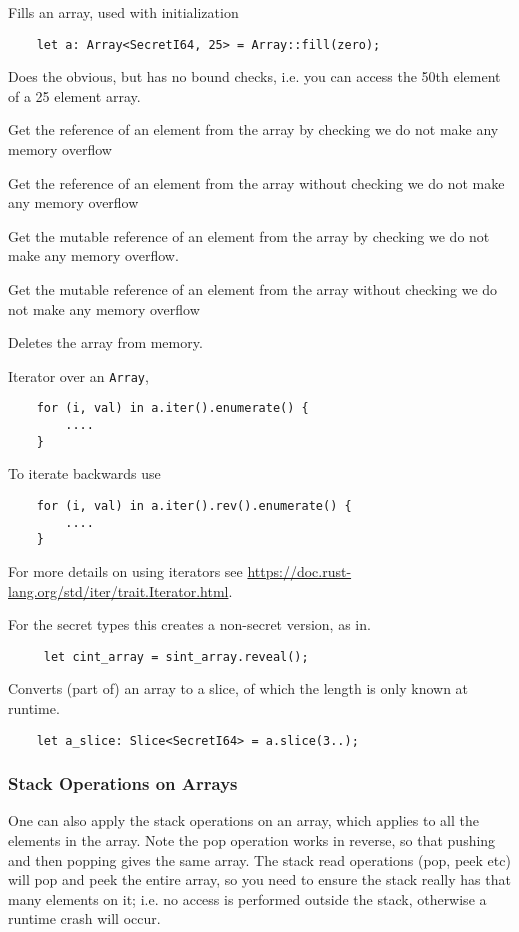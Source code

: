 Fills an array, used with initialization
\begin{lstlisting}
    let a: Array<SecretI64, 25> = Array::fill(zero);
\end{lstlisting}


Does the obvious, but has no bound checks, i.e. you can access the 50th element of a 25 element array.

Get the reference of an element from the array by checking we do not make any memory overflow

Get the reference of an element from the array without checking we do not make any memory overflow

Get the mutable reference of an element from the array by checking we do not make any memory overflow.

Get the mutable reference of an element from the array without checking we do not make any memory overflow

Deletes the array from memory.


Iterator over an \verb|Array|,
\begin{lstlisting}
    for (i, val) in a.iter().enumerate() {
        ....
    }
\end{lstlisting}
To iterate backwards use
\begin{lstlisting}
    for (i, val) in a.iter().rev().enumerate() {
        ....
    }
\end{lstlisting}
For more details on using iterators see \url{https://doc.rust-lang.org/std/iter/trait.Iterator.html}.

For the secret types this creates a non-secret version, as in.
\begin{lstlisting}
     let cint_array = sint_array.reveal();
\end{lstlisting}

Converts (part of) an array to a slice, of which the length is only known at runtime.
\begin{lstlisting}
    let a_slice: Slice<SecretI64> = a.slice(3..);
\end{lstlisting}

\subsubsection{Stack Operations on Arrays}
One can also apply the stack operations on an array, which
applies to all the elements in the array.
Note the pop operation works in reverse, so that pushing and
then popping gives the same array.
The stack read operations (pop, peek etc) will pop and peek
the entire array, so you need to ensure the stack really has
that many elements on it; i.e. no access is performed outside
the stack, otherwise a runtime crash will occur.

